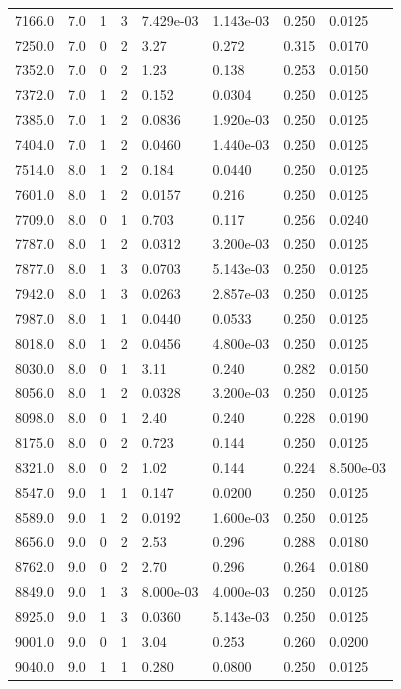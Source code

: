 \documentclass[preview]{standalone}
\begin{document}
{{{{\begin{tabular}{L{1.2cm}C{1.2cm} C{0.3cm}C{0.5cm} C{1.4cm}C{1.4cm} C{1.4cm}C{1.4cm}}
  7166.0  &   7.0  & 1     &  3 &  7.429e-03  & 1.143e-03  & 0.250 &  0.0125   \\ 
  7250.0  &   7.0  & 0     &  2 &  3.27  & 0.272  & 0.315 &  0.0170   \\ 
  7352.0  &   7.0  & 0     &  2 &  1.23  & 0.138  & 0.253 &  0.0150   \\ 
  7372.0  &   7.0  & 1     &  2 &  0.152  & 0.0304  & 0.250 &  0.0125   \\ 
  7385.0  &   7.0  & 1     &  2 &  0.0836  & 1.920e-03  & 0.250 &  0.0125   \\ 
  7404.0  &   7.0  & 1     &  2 &  0.0460  & 1.440e-03  & 0.250 &  0.0125   \\ 
  7514.0  &   8.0  & 1     &  2 &  0.184  & 0.0440  & 0.250 &  0.0125   \\ 
  7601.0  &   8.0  & 1     &  2 &  0.0157  & 0.216  & 0.250 &  0.0125   \\ 
  7709.0  &   8.0  & 0     &  1 &  0.703  & 0.117  & 0.256 &  0.0240   \\ 
  7787.0  &   8.0  & 1     &  2 &  0.0312  & 3.200e-03  & 0.250 &  0.0125   \\ 
  7877.0  &   8.0  & 1     &  3 &  0.0703  & 5.143e-03  & 0.250 &  0.0125   \\ 
  7942.0  &   8.0  & 1     &  3 &  0.0263  & 2.857e-03  & 0.250 &  0.0125   \\ 
  7987.0  &   8.0  & 1     &  1 &  0.0440  & 0.0533  & 0.250 &  0.0125   \\ 
  8018.0  &   8.0  & 1     &  2 &  0.0456  & 4.800e-03  & 0.250 &  0.0125   \\ 
  8030.0  &   8.0  & 0     &  1 &  3.11  & 0.240  & 0.282 &  0.0150   \\ 
  8056.0  &   8.0  & 1     &  2 &  0.0328  & 3.200e-03  & 0.250 &  0.0125   \\ 
  8098.0  &   8.0  & 0     &  1 &  2.40  & 0.240  & 0.228 &  0.0190   \\ 
  8175.0  &   8.0  & 0     &  2 &  0.723  & 0.144  & 0.250 &  0.0125   \\ 
  8321.0  &   8.0  & 0     &  2 &  1.02  & 0.144  & 0.224 &  8.500e-03   \\ 
  8547.0  &   9.0  & 1     &  1 &  0.147  & 0.0200  & 0.250 &  0.0125   \\ 
  8589.0  &   9.0  & 1     &  2 &  0.0192  & 1.600e-03  & 0.250 &  0.0125   \\ 
  8656.0  &   9.0  & 0     &  2 &  2.53  & 0.296  & 0.288 &  0.0180   \\ 
  8762.0  &   9.0  & 0     &  2 &  2.70  & 0.296  & 0.264 &  0.0180   \\ 
  8849.0  &   9.0  & 1     &  3 &  8.000e-03  & 4.000e-03  & 0.250 &  0.0125   \\ 
  8925.0  &   9.0  & 1     &  3 &  0.0360  & 5.143e-03  & 0.250 &  0.0125   \\ 
  9001.0  &   9.0  & 0     &  1 &  3.04  & 0.253  & 0.260 &  0.0200   \\ 
  9040.0  &   9.0  & 1     &  1 &  0.280  & 0.0800  & 0.250 &  0.0125   \\ 
\hline 
\end{tabular} 

}}}}
\end{document}
